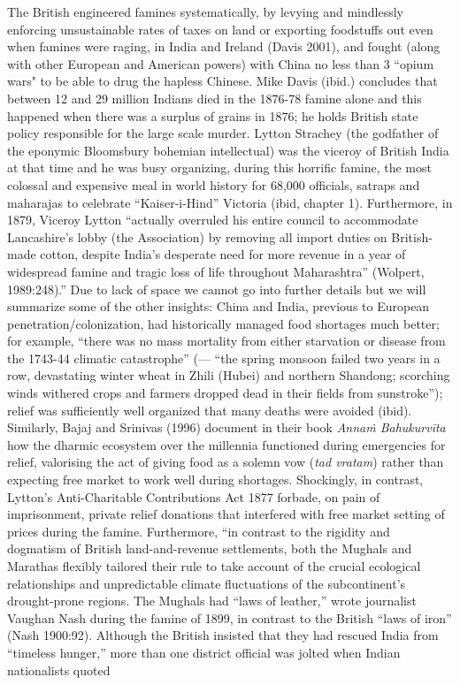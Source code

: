 The British engineered famines systematically, by levying and mindlessly enforcing unsustainable rates of taxes on land or exporting foodstuffs out even when famines were raging, in India and Ireland (Davis 2001), and fought (along with other European and American powers) with China no less than 3 ``opium wars" to be able to drug the hapless Chinese. Mike Davis (ibid.) concludes that between 12 and 29 million Indians died in the 1876-78 famine alone and this happened when there was a surplus of grains in 1876; he holds British state policy responsible for the large scale murder. Lytton Strachey (the godfather of the eponymic Bloomsbury bohemian intellectual) was the viceroy of British India at that time and he was busy organizing, during this horrific famine, the most colossal and expensive meal in world history for 68,000 officials, satraps and maharajas to celebrate “Kaiser-i-Hind” Victoria (ibid, chapter 1). Furthermore, in 1879, Viceroy Lytton “actually overruled his entire council to accommodate Lancashire’s lobby (the Association) by removing all import duties on British-made cotton, despite India’s desperate need for more revenue in a year of widespread famine and tragic loss of life throughout Maharashtra” (Wolpert, 1989:248).” Due to lack of space we cannot go into further details but we will summarize some of the other insights: China and India, previous to European penetration/colonization, had historically managed food shortages much better; for example, “there was no mass mortality from either starvation or disease from the 1743-44 climatic catastrophe” (--- “the spring monsoon failed two years in a row, devastating winter wheat in Zhili (Hubei) and northern Shandong; scorching winds withered crops and farmers dropped dead in their fields from sunstroke”); relief was sufficiently well organized that many deaths were avoided (ibid). Similarly, Bajaj and Srinivas (1996) document in their book {\sl Annaṁ Bahukurvīta} how the dharmic ecosystem over the millennia  functioned during emergencies for relief, valorising the act of giving food as a solemn vow ({\sl tad vratam}) rather than expecting free market to work well during shortages. Shockingly, in contrast, Lytton's Anti-Charitable Contributions Act 1877 forbade, on pain of imprisonment, private relief donations that interfered with free market setting of prices during the famine.  Furthermore, “in contrast to the rigidity and dogmatism of British land-and-revenue settlements, both the Mughals and Marathas flexibly tailored their rule to take account of the crucial ecological relationships and unpredictable climate fluctuations of the subcontinent’s drought-prone regions. The Mughals had “laws of leather,” wrote journalist Vaughan Nash during the famine of 1899, in contrast to the British “laws of iron” (Nash 1900:92). Although the British insisted that they had rescued India from “timeless hunger,” more than one district official was jolted when Indian nationalists quoted 